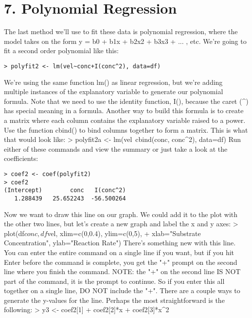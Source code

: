 {%
\section*{7. Polynomial Regression}


The last method we'll use to fit these data is polynomial regression, where the model takes on the form y = b0 + b1x + b2x2 + b3x3 + ... , etc. We're going to fit a second order polynomial like this: 
\begin{framed}
\begin{verbatim}
> polyfit2 <- lm(vel~conc+I(conc^2), data=df)
\end{verbatim}
\end{framed}
We're using the same function lm() as linear regression, but we're adding multiple instances of the explanatory variable to generate our polynomial formula. Note that we need to use the identity function, I(), because the caret (^) has special meaning in a formula. Another way to build this formula is to create a matrix where each column contains the explanatory variable raised to a power. Use the function cbind() to bind columns together to form a matrix. This is what that would look like: 
> polyfit2a <- lm(vel~cbind(conc, conc^2), data=df)
Run either of these commands and view the summary or just take a look at the coefficients: 
\begin{framed}
\begin{verbatim}
> coef2 <- coef(polyfit2)
> coef2
(Intercept)        conc   I(conc^2) 
   1.288439   25.652243  -56.500264 
   \end{verbatim}
\end{framed}
Now we want to draw this line on our graph. We could add it to the plot with the other two lines, but let's create a new graph and label the x and y axes: 
> plot(df$conc, df$vel, xlim=c(0,0.4), ylim=c(0,5), 
+ xlab="Substrate Concentration", ylab="Reaction Rate")
There's something new with this line. You can enter the entire command on a single line if you want, but if you hit Enter before the command is complete, you get the "+" prompt on the second line where you finish the command. NOTE: the "+" on the second line IS NOT part of the command, it is the prompt to continue. So if you enter this all together on a single line, DO NOT include the "+". 
There are a couple ways to generate the y-values for the line. Perhaps the most straightforward is the following: 
> y3 <- coef2[1] + coef2[2]*x + coef2[3]*x^2
}
